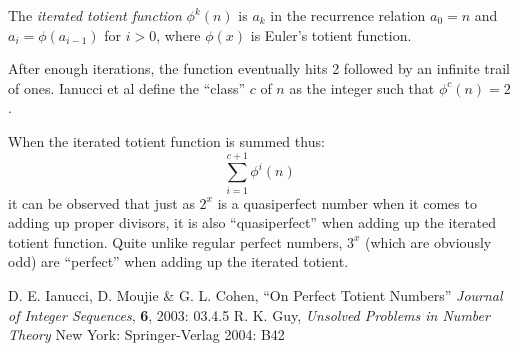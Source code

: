 \documentclass[12pt]{article}
\begin{document}
The {\em iterated totient function} $\phi^k(n)$ is $a_k$ in the recurrence relation $a_0 = n$ and $a_i = \phi(a_{i - 1})$ for $i > 0$, where $\phi(x)$ is Euler's totient function.

After enough iterations, the function eventually hits 2 followed by an infinite trail of ones. Ianucci et al define the ``class'' $c$ of $n$ as the integer such that $\phi^c(n) = 2$.

When the iterated totient function is summed thus: $$\sum_{i = 1}^{c + 1} \phi^i(n)$$ it can be observed that just as $2^x$  is a quasiperfect number when it comes to adding up proper divisors, it is also ``quasiperfect'' when adding up the iterated totient function. Quite unlike regular perfect numbers, $3^x$ (which are obviously odd) are ``perfect'' when adding up the iterated totient.

\begin{thebibliography}{2}
 D. E. Ianucci, D. Moujie \& G. L. Cohen, ``On Perfect Totient Numbers'' {\it Journal of Integer Sequences}, {\bf 6}, 2003: 03.4.5
 R. K. Guy, {\it Unsolved Problems in Number Theory} New York: Springer-Verlag 2004: B42
\end{thebibliography}
\end{document}
